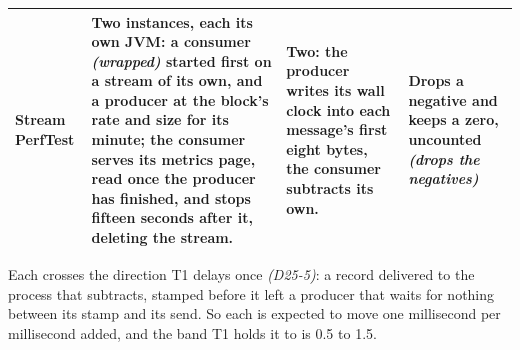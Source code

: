 \documentclass[11pt]{article}
\newcommand{\gl}[1]{{\color{soft}\itshape\small (#1)}}
\begin{document}
{\begin{longtable}{@{}>{\raggedright\arraybackslash}p{2.6cm} >{\raggedright\arraybackslash}p{5.2cm} >{\raggedright\arraybackslash}p{3.2cm} >{\raggedright\arraybackslash}p{4.4cm}@{}}
Stream PerfTest & Two instances, each its own JVM: a consumer \gl{wrapped} started first on a stream of its own, and a producer at the block's rate and size for its minute; the consumer serves its metrics page, read once the producer has finished, and stops fifteen seconds after it, deleting the stream. & \textbf{Two}: the producer writes its wall clock into each message's first eight bytes, the consumer subtracts its own. & Drops a negative and keeps a zero, uncounted \gl{drops the negatives} \\
\bottomrule
\end{longtable}}

Each crosses the direction T1 delays once \gl{D25-5}: a record delivered to the process that
subtracts, stamped before it left a producer that waits for nothing between its stamp and its send.
So each is expected to move one millisecond per millisecond added, and the band T1 holds it to is
0.5 to 1.5.
\end{document}

